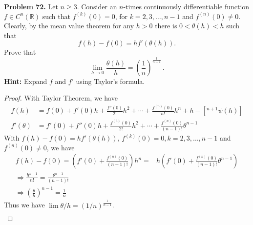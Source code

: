 \documentclass[12pt,leqno]{amsart}
\theoremstyle{definition}
\begin{document}
\noindent
{\bf Problem 72.}
Let $n\geq 3$. Consider an $n$-times continuously differentiable function $f\in C^n(\mathbb{R})$ such that
$f^{(k)}(0)=0$,  for $k=2,3,\dots,n-1$ and $f^{(n)}(0)\neq 0$.
Clearly, by the mean value theorem for any $h>0$ there is $0<\theta(h)<h$ such that
$$
f(h)-f(0)=hf'(\theta(h)).
$$
Prove that
$$
\lim_{h\to 0}\frac{\theta(h)}{h}=\left(\frac{1}{n}\right)^{\frac{1}{n-1}}\, .
$$
{\bf Hint:}  Expand $f$ and $f'$ using Taylor's formula.
\begin{proof}
With Taylor Theorem, we have
\begin{align*}
    f(h) & = f(0) + f'(0)h + \frac{f''(0)}{2!}h^2 + \cdots + \frac{f^{(n)}(0)}{n!}h^n + h-[^{n+1}\psi(h)] \\
    f'(\theta) & = f'(0) + f''(0)h + \frac{f^{(3)}(0)}{2!}h^2 + \cdots + \frac{f^{(n)}(0)}{(n-1)!}\theta^{n-1}
\end{align*}
With $f(h)-f(0)=hf'(\theta(h))$, $f^{(k)}(0)=0,k=2,3,\dots,n-1$ and $f^{(n)}(0)\neq 0$, we have 
\begin{align*}
    f(h) - f(0) = \left(f'(0)+\frac{f^{(n)}(0)}{(n-1)!}\right)h^n = &  h \left(f'(0)+\frac{f^{(n)}(0)}{(n-1)!}\theta^{n-1}\right) \\
    \Rightarrow \frac{h^{n-1}}{n!} = \frac{\theta^{n-1}}{(n-1)!} & \\
    \Rightarrow \left(\frac{\theta}{h} \right)^{n-1} = \frac{1}{n}
\end{align*}
Thus we have $\lim \theta/h = \left(1/n\right)^{\frac{1}{n-1}}$.
\begin{align*}
    
\end{align*}
\end{proof}

\medskip
\end{document}
